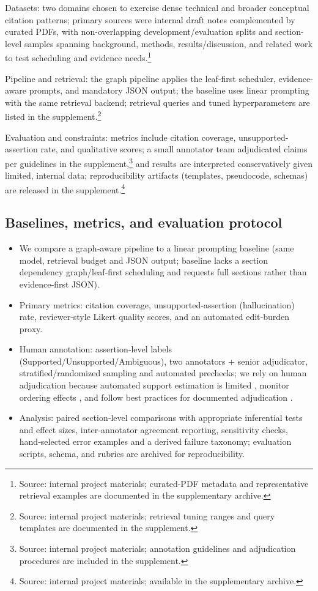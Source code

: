 \documentclass{article}%
\providecommand{\tightlist}{}%
\begin{document}
Datasets: two domains chosen to exercise dense technical and broader conceptual citation patterns; primary sources were internal draft notes complemented by curated PDFs, with non-overlapping development/evaluation splits and section-level samples spanning background, methods, results/discussion, and related work to test scheduling and evidence needs.\footnote{Source: internal project materials; curated-PDF metadata and representative retrieval examples are documented in the supplementary archive.}

Pipeline and retrieval: the graph pipeline applies the leaf-first scheduler, evidence-aware prompts, and mandatory JSON output; the baseline uses linear prompting with the same retrieval backend; retrieval queries and tuned hyperparameters are listed in the supplement.\footnote{Source: internal project materials; retrieval tuning ranges and query templates are documented in the supplement.}

Evaluation and constraints: metrics include citation coverage, unsupported-assertion rate, and qualitative scores; a small annotator team adjudicated claims per guidelines in the supplement,\footnote{Source: internal project materials; annotation guidelines and adjudication procedures are included in the supplement.} and results are interpreted conservatively given limited, internal data; reproducibility artifacts (templates, pseudocode, schemas) are released in the supplement.\footnote{Source: internal project materials; available in the supplementary archive.}%

%
\subsection{Baselines, metrics, and evaluation protocol}%


%
\begin{itemize}
\tightlist
\item
  We compare a graph‑aware pipeline to a linear prompting baseline (same model, retrieval budget and JSON output; baseline lacks a section dependency graph/leaf‑first scheduling and requests full sections rather than evidence‑first JSON).
\item
  Primary metrics: citation coverage, unsupported‑assertion (hallucination) rate, reviewer‑style Likert quality scores, and an automated edit‑burden proxy.
\item
  Human annotation: assertion‑level labels (Supported/Unsupported/Ambiguous), two annotators + senior adjudicator, stratified/randomized sampling and automated prechecks; we rely on human adjudication because automated support estimation is limited \cite{2408.12398v1}, monitor ordering effects \cite{2007.03177v2}, and follow best practices for documented adjudication \cite{2506.13776v1}.
\item
  Analysis: paired section‑level comparisons with appropriate inferential tests and effect sizes, inter‑annotator agreement reporting, sensitivity checks, hand‑selected error examples and a derived failure taxonomy; evaluation scripts, schema, and rubrics are archived for reproducibility.
\end{itemize}%
\end{document}
